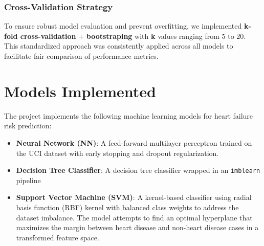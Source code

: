 \documentclass[11pt,a4paper]{article}
\begin{document}

\subsubsection{Cross-Validation Strategy}
\vspace{-0.25cm}
To ensure robust model evaluation and prevent overfitting,
we implemented \textbf{k-fold cross-validation} + \textbf{bootstraping} with \textbf{k} values ranging from 5 to 20.
This standardized approach was consistently applied across all models to facilitate
fair comparison of performance metrics.

\section{Models Implemented}
The project implements the following machine learning models for heart
failure risk prediction:
\begin{itemize}
    \vspace{-0.25cm}
    \item \textbf{Neural Network (NN)}: A feed-forward multilayer perceptron trained on the UCI dataset with early stopping and dropout regularization.
    \item \textbf{Decision Tree Classifier}: A decision tree classifier wrapped in an \texttt{imblearn} pipeline
    \item \textbf{Support Vector Machine (SVM)}: A kernel-based classifier using radial basis function (RBF) kernel with balanced class weights to address the dataset imbalance. The model attempts to find an optimal hyperplane that maximizes the margin between heart disease and non-heart disease cases in a transformed feature space.
\end{itemize}
\end{document}
